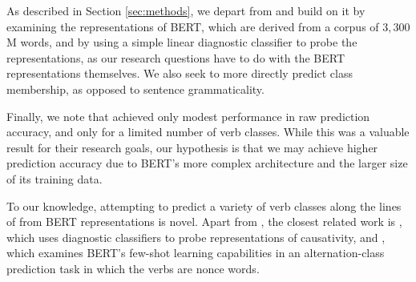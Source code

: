 \documentclass[11pt]{article}
\begin{document}
As described in Section \ref{sec:methods}, we depart from \citealt{kann2018verb} and build on it by examining the representations of BERT, which are derived from a corpus of $3,300$M words, and by using a simple linear diagnostic classifier to probe the representations, as our research questions have to do with the BERT representations themselves.  We also seek to more directly predict class membership, as opposed to sentence grammaticality.

Finally, we note that \citet{kann2018verb} achieved only modest performance in raw prediction accuracy, and only for a limited number of verb classes.  While this was a valuable result for their research goals, our hypothesis is that we may achieve higher prediction accuracy due to BERT's more complex architecture and the larger size of its training data.

To our knowledge, attempting to predict a variety of verb classes along the lines of \citealt{levin1993} from BERT representations is novel.  Apart from \citealt{kann2018verb}, the closest related work is \citealt{causativity-neurons}, which uses diagnostic classifiers to probe representations of causativity, and \citealt{thrush2020investigating}, which examines BERT's few-shot learning capabilities in an alternation-class prediction task in which the verbs are nonce words.
\end{document}
